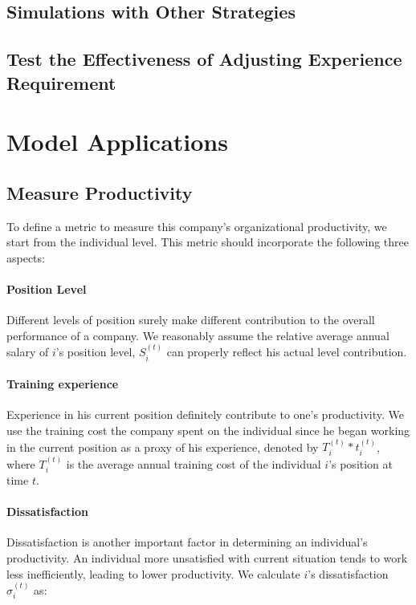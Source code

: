 \documentclass[tcn = 37075, sheet = true, abstract = true]{mcmthesis}
\begin{document}
\subsection{Simulations with Other Strategies}

\subsection{Test the Effectiveness of Adjusting Experience Requirement}


\section{Model Applications}

\subsection{Measure Productivity}

To define a metric to measure this company's organizational productivity, we start from the individual level. This metric should incorporate the following three aspects:

\paragraph{Position Level}
Different levels of position surely make different contribution to the overall performance of a company. We reasonably assume the relative average annual salary of $i$'s position level, $S_i^{(t)}$ can properly reflect his actual level contribution.

\paragraph{Training experience}
Experience in his current position definitely contribute to one's productivity. We use the training cost the company spent on the individual since he began working in the current position as a proxy of his experience, denoted by $T_i^{(t)}*t_i^{(t)}$, where $T_i^{(t)}$ is the average annual training cost of the individual $i$'s position at time $t$.

\paragraph{Dissatisfaction}
Dissatisfaction is another important factor in determining an individual's productivity. An individual more unsatisfied with current situation tends to work less inefficiently, leading to lower productivity. We calculate $i$'s dissatisfaction $\sigma_i^{(t)}$ as:
\end{document}
